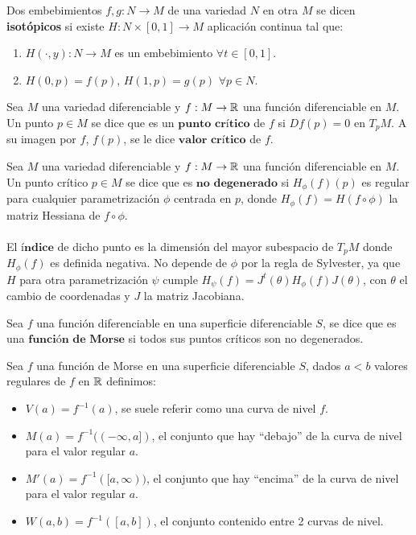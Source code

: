 \begin{definicion} Dos embebimientos $f,g : N \rightarrow M$ de una variedad $N$ en otra $M$ se dicen \textbf{isotópicos} si existe $H: N \times [0,1] \rightarrow M$ aplicación continua tal que:
	\begin{enumerate}
		\item $H(\cdot, y) : N \rightarrow M$ es un embebimiento $\forall t \in [0,1]$.
		\item $H(0, p) = f(p)$, $H(1,p) = g(p)$ $\forall p \in N$.
	\end{enumerate}
\end{definicion}

\begin{definicion} Sea $M$ una variedad diferenciable y $f: M \rightarrow \mathbb{R}$ una función diferenciable en $M$. Un punto $p \in M$ se dice que es un $\textbf{punto crítico}$ de $f$ si $Df(p) = 0$ en $T_pM$. A su imagen por $f$, $f(p)$, se le dice $\textbf{valor crítico}$ de $f$.
\end{definicion}

\begin{definicion} Sea $M$ una variedad diferenciable y $f: M \rightarrow \mathbb{R}$ una función diferenciable en $M$. Un punto crítico $p \in M$ se dice que es $\textbf{no degenerado}$ si $H_\phi(f)(p)$ es regular para cualquier parametrización $\phi$ centrada en $p$, donde $H_\phi(f)=H(f \circ \phi)$ la matriz Hessiana de $f \circ \phi$.\\ 
\\ El $\textbf{índice}$ de dicho punto es la dimensión del mayor subespacio de $T_pM$ donde $H_\phi(f)$ es definida negativa. No depende de $\phi$ por la regla de Sylvester, ya que $H$ para otra parametrización $\psi$ cumple $H_\psi(f) = J^t(\theta) H_\phi(f) J(\theta)$, con $\theta$ el cambio de coordenadas y $J$ la matriz Jacobiana.
\end{definicion}

\begin{definicion} Sea $f$ una función diferenciable en una superficie diferenciable $S$, se dice que es una $\textbf{función de Morse}$ si todos sus puntos críticos son no degenerados.
\end{definicion}

\newpage
\begin{definicion} Sea $f$ una función de Morse en una superficie diferenciable $S$, dados $a < b$ valores regulares de $f$ en $\mathbb{R}$ definimos:
	\begin{itemize}
		\item $V(a) = f^{-1}(a)$, se suele referir como una curva de nivel $f$.
		\item $M(a) = f^{-1}((-\infty, a])$, el conjunto que hay ``debajo'' de la curva de nivel para el valor regular $a$.
		\item $M'(a) = f^{-1}([a,\infty))$, el conjunto que hay ``encima'' de la curva de nivel para el valor regular $a$.
		\item $W(a,b) = f^{-1}([a,b])$, el conjunto contenido entre 2 curvas de nivel.
	\end{itemize}
\end{definicion}

